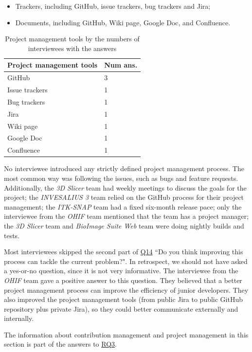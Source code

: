 \documentclass[final, 3p, times, authoryear]{elsarticle}
\begin{document}
\begin{itemize}
\item Trackers, including GitHub, issue trackers, bug trackers and Jira;
\item Documents, including GitHub, Wiki page, Google Doc, and Confluence.
\end{itemize}

\begin{table}[ht]
\centering
\begin{tabular}{ll}
\hline
Project management tools & Num ans. \\ \hline
GitHub & 3 \\
Issue trackers & 1 \\
Bug trackers & 1 \\
Jira & 1 \\
Wiki page & 1 \\
Google Doc & 1 \\
Confluence & 1 \\ \hline
\end{tabular}
\caption{\label{tab_pm_tools}Project management tools by the numbers of
interviewees with the answers}
\end{table}

No interviewee introduced any strictly defined project management process. The
most common way was following the issues, such as bugs and feature requests.
Additionally, the \textit{3D Slicer} team had weekly meetings to discuss the
goals for the project; the \textit{INVESALIUS 3} team relied on the GitHub
process for their project management; the \textit{ITK-SNAP} team had a fixed
six-month release pace; only the interviewee from the \textit{OHIF} team
mentioned that the team has a project manager; the \textit{3D Slicer} team and
\textit{BioImage Suite Web} team were doing nightly builds and tests.

Most interviewees skipped the second part of \hyperlink{q14}{Q14} ``Do you think
improving this process can tackle the current problem?". In retrospect, we
should not have asked a yes-or-no question, since it is not very informative.
The interviewee from the \textit{OHIF} team gave a positive answer to this
question. They believed that a better project management process can improve the
efficiency of junior developers. They also improved the project management tools
(from public Jira to public GitHub repository plus private Jira), so they could
better communicate externally and internally.

The information about contribution management and project management in this
section is part of the answers to \hyperlink{rq3}{RQ3}.
\end{document}
